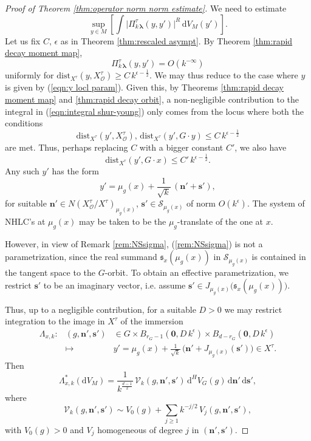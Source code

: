 \documentclass[12pt,a4paper]{article}
\theoremstyle{plain}
\theoremstyle{definition}
\begin{document}
\begin{proof}
[Proof of Theorem \ref{thm:operator norm norm estimate}]
We need to estimate 
\begin{equation}
\label{eqn:integral shur-young}
\sup_{y\in M} \left[
\int\big|\Pi^\tau_{k\,\boldsymbol{\lambda}}(y,y')\big|^R\,
\mathrm{d}V_M(y') \right] .
\end{equation}
%
Let us fix $C,\,\epsilon$ as in Theorem \ref{thm:rescaled asympt}.
By Theorem \ref{thm:rapid decay moment map}, 
$$
\Pi^\tau_{k\,\boldsymbol{\lambda}}(y,y')=O\left(
k^{-\infty}\right)
$$
uniformly for $\mathrm{dist}_{X^\tau}(y,X^\tau_{\mathcal{O}})
\ge C\,k^{\epsilon-\frac{1}{2}}$. We may thus reduce to the case
where $y$ is given by (\ref{eqn:y locl param}).
Given this, by Theorems \ref{thm:rapid decay moment map} and 
\ref{thm:rapid decay orbit}, a non-negligible contribution to
the integral in (\ref{eqn:integral shur-young}) only comes from the
locus where both the conditions
$$
\mathrm{dist}_{X^\tau}(y',X^\tau_{\mathcal{O}}),\,
\mathrm{dist}_{X^\tau}(y',G\cdot y)
\le C\,k^{\epsilon-\frac{1}{2}}
$$
are met. 
Thus, perhaps replacing $C$ with a bigger constant $C'$, we also have
$$\mathrm{dist}_{X^\tau}(y',G\cdot x)
\le C'\,k^{\epsilon-\frac{1}{2}}.
$$
%
Any such $y'$ has the form
\begin{equation}
\label{eqn:y'n's'}
y'=\mu_g(x)+\frac{1}{\sqrt{k}}\,(\mathbf{n}'+\mathbf{s}'),
\end{equation}
for suitable $\mathbf{n}'\in  N(X^\tau_{\mathcal{O}}/X^\tau)_{\mu_g(x)}$, 
$\mathbf{s}'\in \mathcal{S}_{\mu_g(x)}$ of norm 
$O\left(k^\epsilon\right)$.
The system of NHLC's at $\mu_g(x)$ may be taken to be the $\mu_g$-translate of the one at $x$.

However, in view of Remark
\ref{rem:NSsigma}, (\ref{rem:NSsigma}) is not a parametrization,
since the real summand $\mathfrak{s}_x(\mu_g(x))$ in
$\mathcal{S}_{\mu_g(x)}$ is contained in the
tangent space to the $G$-orbit. To obtain an effective parametrization, we
restrict $\mathbf{s}'$ to be an imaginary vector,
i.e. assume
$\mathbf{s}'\in J_{\mu_g(x)}\big( \mathfrak{s}_x(\mu_g(x)) \big)$.

Thus, up to a negligible contribution, for a suitable $D>0$ we may restrict integration to the
image in $X^\tau$ of the immersion 
\begin{eqnarray}
\label{eqn:Lambda_x}
\Lambda_{x,k}:&
(g,\mathbf{n}',\mathbf{s}')&\in 
G\times B_{r_G-1}\left(\mathbf{0},D\,k^\epsilon\right)
\times B_{d-r_G}\left(\mathbf{0},D\,k^\epsilon\right)\\
&\mapsto &
y'=\mu_g(x)+\frac{1}{\sqrt{k}}\,\big(\mathbf{n}'+J_{\mu_g(x)}(\mathbf{s}') \big)
\in 
X^\tau.\nonumber
\end{eqnarray}
%
Then 
\begin{equation}
\label{eqn:Lambda x volume form pb}
\Lambda_{x,k}^*(\mathrm{d}V_M)=
\frac{1}{k^{\frac{d-1}{2}}}\,\mathcal{V}_k(g,\mathbf{n}',
\mathbf{s}')\,\mathrm{d}^HV_G(g)
\,\mathrm{d}\mathbf{n}'
\,\mathrm{d}\mathbf{s}',
\end{equation}
where 
$$
\mathcal{V}_k(g,\mathbf{n}',
\mathbf{s}')\sim V_0(g)
+\sum_{j\ge 1}k^{-j/2}\,V_j(g,\mathbf{n}',
\mathbf{s}'),
$$
with $V_0(g)>0$ and $V_j$
homogeneous of degree $j$ in $(\mathbf{n}',\mathbf{s}')$.


\end{proof}
\end{document}
